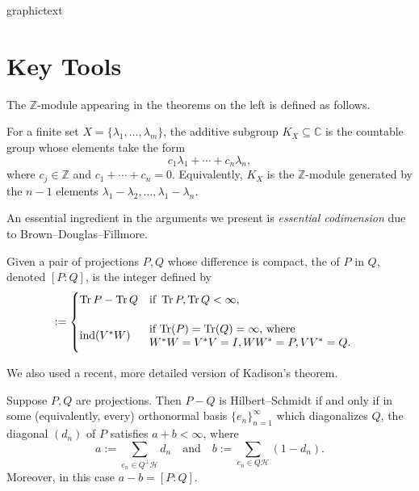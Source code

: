 \documentclass{article}
\DeclareMathOperator{\trace}{Tr}
\DeclareMathOperator{\ind}{ind}
\newcommand{\Hil}{\ensuremath{\mathcal{H}}}
\begin{document}
\begin{staticcontents*}{graphictext}
  \section*{Key Tools}

  The $\mathbb{Z}$-module appearing in the theorems on the left is defined as follows.
  
  \begin{definition}
    For a finite set $X = \{\lambda_1,\ldots,\lambda_m\}$, the additive subgroup $K_X \subseteq \mathbb{C}$ is the countable group whose elements take the form
    \begin{equation*}
      c_1 \lambda_1 + \cdots + c_n \lambda_n,
    \end{equation*}
    where $c_j \in \mathbb{Z}$ and $c_1 + \cdots + c_n = 0$.
    Equivalently, $K_X$ is the $\mathbb{Z}$-module generated by the $n-1$ elements $\lambda_1-\lambda_2,\ldots,\lambda_1-\lambda_n$.
  \end{definition}

  An essential ingredient in the arguments we present is \emph{essential codimension} due to Brown--Douglas--Fillmore.

  \begin{definition}
    Given a pair of projections $P,Q$ whose difference is compact, the  of $P$ in $Q$, denoted $[P:Q]$, is the integer defined by
    \begin{equation*}
      [P:Q] :=
      \begin{cases}
        \trace P-\trace Q & \text{if}\ \trace P,\trace Q < \infty, \\[1em]
        \ind(V^{*}W) & \parbox[c][3em]{0.55\textwidth}{if $\trace(P) = \trace(Q) = \infty$, where \\
          $W^{*}W = V^{*}V = I, WW^{*} = P, VV^{*} = Q$.} \\[0.4em]
      \end{cases}
    \end{equation*}
  \end{definition}

  We also used a recent, more detailed version of Kadison's theorem.

  \begin{theorem}
    Suppose $P,Q$ are projections. Then $P-Q$ is Hilbert--Schmidt if and only if in some (equivalently, every) orthonormal basis $\{e_n\}_{n=1}^{\infty}$ which diagonalizes $Q$, the diagonal $(d_n)$ of $P$ satisfies $a+b < \infty$, where
    \begin{equation*}
      a := \sum_{e_n \in Q^{\perp}\Hil} d_n \quad\text{and}\quad b := \sum_{e_n \in Q\Hil} (1-d_n).
    \end{equation*}
    Moreover, in this case $a-b = [P:Q]$.
  \end{theorem}


\end{staticcontents*}
\end{document}
